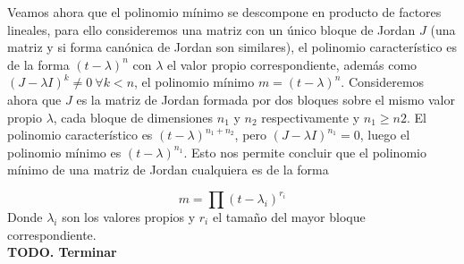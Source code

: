 Veamos ahora que el polinomio mínimo se descompone en producto de factores
lineales, para ello consideremos una matriz con un único bloque de Jordan \(J\)
(una matriz y si forma canónica de Jordan son similares), el polinomio
característico es de la forma \((t-\lambda)^n\) con \(\lambda\) el valor propio
correspondiente, además como \((J - \lambda I)^k\neq 0 \ \forall k < n\), el
polinomio mínimo \(m = (t-\lambda)^n\). Consideremos ahora que \(J\) es la
matriz de Jordan formada por dos bloques sobre el mismo valor propio
\(\lambda\), cada bloque de dimensiones \(n_1\) y \(n_2\) respectivamente y
\(n_1 \geq n2\). El
polinomio característico es \((t-\lambda)^{n_1+n_2}\), pero \((J-\lambda I)^{n_1}
= 0\), luego el polinomio mínimo es \((t-\lambda)^{n_1}\). Esto nos permite
concluir que el polinomio mínimo de una matriz de Jordan cualquiera es de la
forma

\[
  m = \prod(t - \lambda_i)^{r_i}
\]
Donde \(\lambda_i\) son los valores propios y \(r_i\) el tamaño del mayor bloque correspondiente.\\


\textbf{TODO. Terminar}
